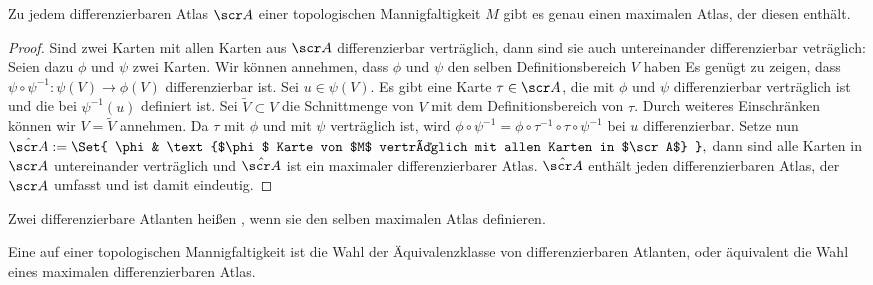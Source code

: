 \begin{st} \label{1.7}
    Zu jedem differenzierbaren Atlas $\scr A$ einer topologischen Mannigfaltigkeit $M$ gibt es genau einen maximalen Atlas, der diesen enthält.
    \begin{proof}
        Sind zwei Karten mit allen Karten aus $\scr A$ differenzierbar verträglich, dann sind sie auch untereinander differenzierbar veträglich:
        Seien dazu $\phi$ und $\psi$ zwei Karten.
        Wir können annehmen, dass $\phi$ und $\psi$ den selben Definitionsbereich $V$ haben
        Es genügt zu zeigen, dass
        \begin{math}
            \psi \circ \psi^{-1}: \psi(V) \to \phi(V)
        \end{math}
        differenzierbar ist.
        Sei $u \in \psi(V)$.
        Es gibt eine Karte $\tau \in \scr A$, die mit $\phi$ und $\psi$ differenzierbar verträglich ist und die bei $\psi^{-1}(u)$ definiert ist.
        Sei $\tilde V \subset V$ die Schnittmenge von $V$ mit dem Definitionsbereich von $\tau$.
        Durch weiteres Einschränken können wir $V = \tilde V$ annehmen.
        Da $\tau$ mit $\phi$ und mit $\psi$ verträglich ist, wird
        \begin{math}
            \phi \circ \psi^{-1} = \phi \circ \tau^{-1} \circ \tau \circ \psi^{-1}
        \end{math}
        bei $u$ differenzierbar.
        Setze nun
        \begin{math}
            \hat{\scr A} := \Set{ \phi & \text{$\phi$ Karte von $M$ verträglich mit allen Karten in $\scr A$} },
        \end{math}
        dann sind alle Karten in $\scr A$ untereinander verträglich und $\hat{\scr A}$ ist ein maximaler differenzierbarer Atlas.
        $\hat{\scr A}$ enthält jeden differenzierbaren Atlas, der $\scr A$ umfasst und ist damit eindeutig.
    \end{proof}
\end{st}

\begin{df*}
    Zwei differenzierbare Atlanten heißen , wenn sie den selben maximalen Atlas definieren.
\end{df*}

\begin{df} \label{1.8}
    Eine  auf einer topologischen Mannigfaltigkeit ist die Wahl der Äquivalenzklasse von differenzierbaren Atlanten, oder äquivalent die Wahl eines maximalen differenzierbaren Atlas.
\end{df}






